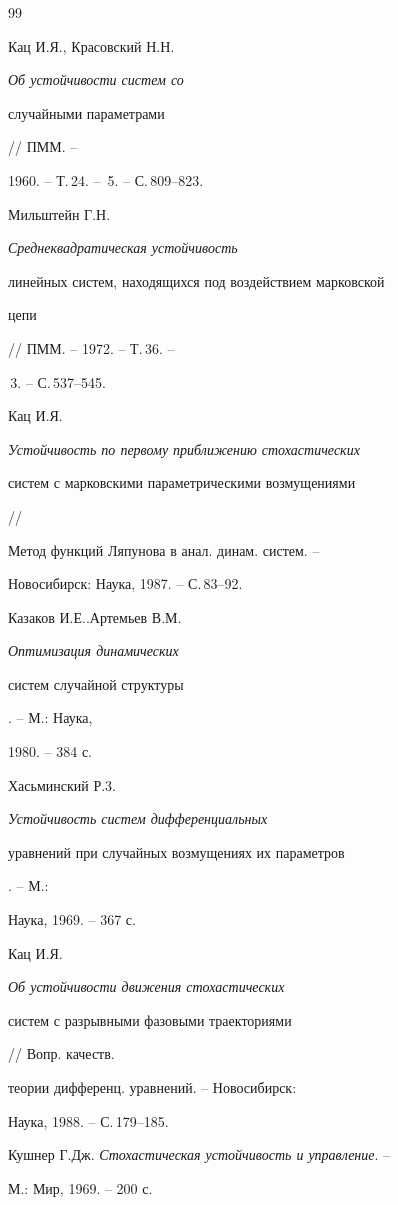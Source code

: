 \begin{thebibliography}{99} 


 




Кац И.Я., Красовский Н.Н. {\em Об устойчивости систем со 


случайными параметрами} // ПММ. -- 


1960. -- Т.\,24. -- \No\,5. -- С.\,809--823. 




Мильштейн Г.Н. {\em Среднеквадратическая устойчивость 


линейных систем, находящихся под воздействием марковской  


цепи} // ПММ. -- 1972. -- Т.\,36. -- 


\No\,3. -- С.\,537--545. 




Кац И.Я. {\em Устойчивость по первому приближению стохастических 


систем с марковскими параметрическими возмущениями} // 


Метод функций Ляпунова в анал. динам. систем. -- 


Новосибирск: Наука, 1987. -- С.\,83--92. 




Казаков И.Е..Артемьев В.М. {\em Оптимизация динамических  


систем случайной структуры}. -- М.: Наука, 


1980. -- 384 с. 


\bibitem{} 


Хасьминский Р.3. {\em Устойчивость систем дифференциальных  


уравнений при случайных возмущениях их параметров}. -- М.: 


Наука, 1969. -- 367 с. 




Кац И.Я. {\em Об устойчивости движения стохастических  


систем с разрывными фазовыми траекториями} // Вопр. качеств. 


теории дифференц. уравнений. -- Новосибирск: 


Наука, 1988. -- С.\,179--185. 




Кушнер Г.Дж. {\em Стохастическая устойчивость и управление}. -- 


М.: Мир, 1969. -- 200 с. 



\end{thebibliography}
